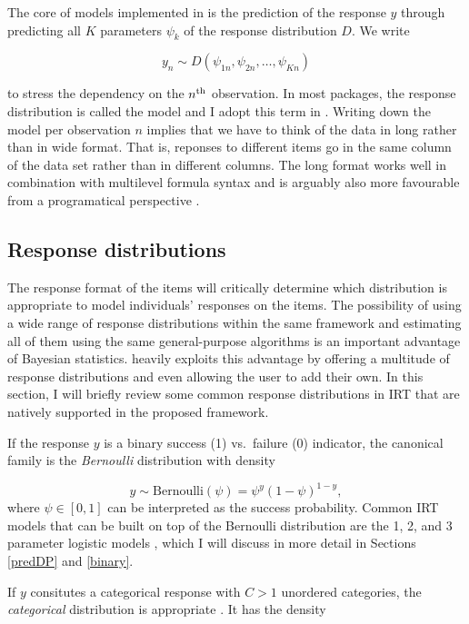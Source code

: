\documentclass[
]{jss}
\begin{document}
The core of models implemented in  is the prediction of the
response \(y\) through predicting all \(K\) parameters \(\psi_k\) of the
response distribution \(D\). We write

\[
y_n \sim D(\psi_{1n}, \psi_{2n}, \ldots, \psi_{Kn})
\]

to stress the dependency on the \(n\textsuperscript{th}\) observation.
In most  packages, the response distribution is called the
model  and I adopt this term in . Writing down
the model per observation \(n\) implies that we have to think of the
data in long rather than in wide format. That is, reponses to different
items go in the same column of the data set rather than in different
columns. The long format works well in combination with multilevel
formula syntax and is arguably also more favourable from a programatical
perspective \citep[e.g., see][]{wickham2016}.

\hypertarget{respdists}{%
\subsection{Response distributions}\label{respdists}}

The response format of the items will critically determine which
distribution is appropriate to model individuals' responses on the
items. The possibility of using a wide range of response distributions
within the same framework and estimating all of them using the same
general-purpose algorithms is an important advantage of Bayesian
statistics.  heavily exploits this advantage by offering a
multitude of response distributions and even allowing the user to add
their own. In this section, I will briefly review some common response
distributions in IRT that are natively supported in the proposed
framework.

If the response \(y\) is a binary success (1) vs.~failure (0) indicator,
the canonical family is the \emph{Bernoulli} distribution with density

\[
y \sim \text{Bernoulli}(\psi) = \psi^y (1-\psi)^{1-y},
\] where \(\psi \in [0, 1]\) can be interpreted as the success
probability. Common IRT models that can be built on top of the Bernoulli
distribution are the 1, 2, and 3 parameter logistic models \citep[1PL,
2PL, and 3PL models;][]{agresti2010}, which I will discuss in more
detail in Sections \ref{predDP} and \ref{binary}.

If \(y\) consitutes a categorical response with \(C > 1\) unordered
categories, the \emph{categorical} distribution is appropriate
\citep{agresti2010}. It has the density
\end{document}
